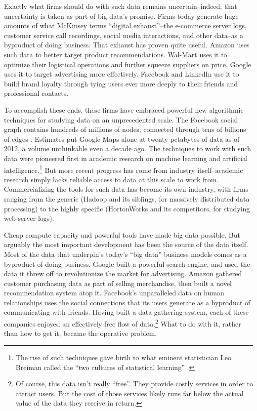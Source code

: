 \documentclass[12pt]{article}
\begin{document}
Exactly what firms should do with such data remains uncertain--indeed,
that uncertainty is taken as part of big data's promise. Firms today
generate huge amounts of what McKinsey terms ``digital exhaust''--the
e-commerce server logs, customer service call recordings, social media
interactions, and other data--as a byproduct of doing business. That
exhaust has proven quite useful. Amazon uses such data to better
target product recommendations. Wal-Mart uses it to optimize their
logistical operations and further squeeze suppliers on price. Google
uses it to target advertising more effectively. Facebook and LinkedIn
use it to build brand loyalty through tying users ever more deeply to
their friends and professional contacts.

To accomplish these ends, these firms have embraced powerful new
algorithmic techniques for studying data on an unprecedented
scale. The Facebook social graph contains hundreds of millions of
nodes, connected through tens of billions of edges
\citep{DBLP:journals/corr/abs-1111-4503}. Estimates put Google Maps
alone at twenty petabytes of data as of 2012, a volume unthinkable
even a decade ago. The techniques to work with such data were
pioneered first in academic research on machine learning and
artificial intelligence.\footnote{The rise of such techniques gave
birth to what eminent statistician Leo Breiman called the ``two
cultures of statistical learning'' \citep{breiman2001statistical}.}
But more recent progress has come from industry itself--academic
research simply lacks reliable access to data at this scale to work
from. Commercializing the tools for such data has become its own
industry, with firms ranging from the generic (Hadoop and its
siblings, for massively distributed data processing) to the highly
specific (HortonWorks and its competitors, for studying web server
logs).

Cheap compute capacity and powerful tools have made big data
possible. But arguably the most important development has been the
source of the data itself. Most of the data that underpin's today's
``big data'' business models comes as a byproduct of doing
business. Google built a powerful search engine, and used the data it
threw off to revolutionize the market for advertising. Amazon gathered
customer purchasing data as part of selling merchandise, then built a
novel recommendation system atop it. Facebook's unparalleled data on
human relationships uses the social
connections that its users generate as a byproduct of communicating
with friends. Having built a data gathering system, each of these
companies enjoyed an effectively free flow of data.\footnote{Of
  course, this data isn't really ``free''. They provide costly
  services in order to attract users. But the cost of those services
  likely runs far below the actual value of the data they receive in
  return.} What to do with it, rather than how to get it, became the
operative problem.
\end{document}
